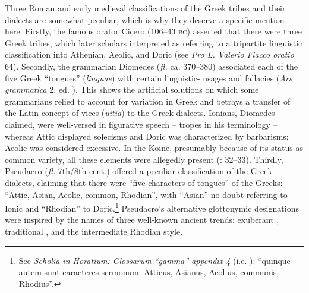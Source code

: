 Three Roman and early medieval classifications of the Greek tribes and their dialects are somewhat peculiar, which is why they deserve a specific mention here. Firstly, the famous orator Cicero (106–43 \textsc{bc}) asserted that there were three Greek tribes, which later scholars interpreted as referring to a tripartite linguistic classification into Athenian, Aeolic, and Doric (see \textit{Pro L. Valerio Flacco oratio} 64). Secondly, the grammarian Diomedes (\textit{fl.} ca. 370–380) associated each of the five Greek “tongues” (\textit{linguae}) with certain linguistic- usages and fallacies (\textit{Ars grammatica} 2, ed. \citealt[440]{Keil1857}). This shows the artificial solutions on which some grammarians relied to account for variation in Greek and betrays a transfer of the Latin concept of vices (\textit{uitia}) to the Greek dialects. Ionians, Diomedes claimed, were well-versed in figurative speech – tropes in his terminology – whereas Attic displayed solecisms and Doric was characterized by barbarisms; Aeolic was considered excessive. In the Koine, presumably because of its status as common variety, all these elements were allegedly present (\citealt{Consani1991}: 32–33). Thirdly, Pseudacro (\textit{fl.} 7th/8th cent.) offered a peculiar classification of the Greek dialects, claiming that there were “five characters of tongues” of the Greeks: “Attic, Asian, Aeolic, common, Rhodian”, with “Asian” no doubt referring to Ionic and “Rhodian” to Doric.\footnote{See \textit{Scholia in Horatium: Glossarum “gamma” appendix 4} (i.e. \citealt[385]{Pseudacro1904}): “quinque autem sunt caracteres sermonum: Atticus, Asianus, Aeolius, communis, Rhodius”.} Pseudacro’s alternative glottonymic designations were inspired by the names of three well-known ancient  trends: exuberant , traditional , and the intermediate Rhodian style.

